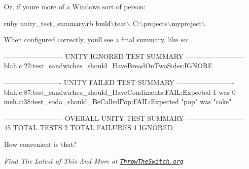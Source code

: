 Or, if you\textquotesingle{}re more of a Windows sort of person\+:


\begin{DoxyCode}
ruby unity\_test\_summary.rb build\(\backslash\)teat\(\backslash\) C:\(\backslash\)projects\(\backslash\)myproject\(\backslash\)
\end{DoxyCode}


When configured correctly, you\textquotesingle{}ll see a final summary, like so\+:


\begin{DoxyCode}
--------------------------
UNITY IGNORED TEST SUMMARY
--------------------------
blah.c:22:test\_sandwiches\_should\_HaveBreadOnTwoSides:IGNORE

-------------------------
UNITY FAILED TEST SUMMARY
-------------------------
blah.c:87:test\_sandwiches\_should\_HaveCondiments:FAIL:Expected 1 was 0
meh.c:38:test\_soda\_should\_BeCalledPop:FAIL:Expected "pop" was "coke"

--------------------------
OVERALL UNITY TEST SUMMARY
--------------------------
45 TOTAL TESTS 2 TOTAL FAILURES 1 IGNORED
\end{DoxyCode}


How convenient is that?

{\itshape Find The Latest of This And More at \href{https://throwtheswitch.org}{\tt Throw\+The\+Switch.\+org}} 